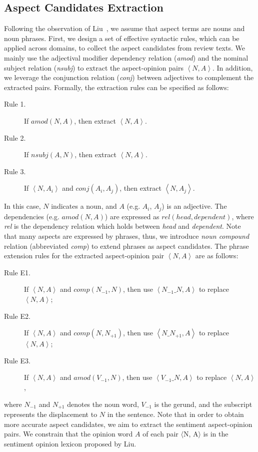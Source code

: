 \subsection{Aspect Candidates Extraction}
\label{sec:candidate}
Following the observation of Liu~\cite{hu2004mining,liu2015automated}, 
we assume that aspect terms are nouns and noun phrases.  
First, we design a set of effective syntactic rules, which can be applied across domains, to collect the aspect candidates from review texts.
We mainly use the adjectival modifier dependency relation (\emph{amod})
and the nominal subject relation (\emph{nsubj})
to extract the aspect-opinion pairs $\left\langle N, A \right\rangle$.
In addition, we leverage the conjunction relation (\emph{conj}) between 
adjectives to complement the extracted pairs. 
Formally, the extraction rules can be specified as follows:
\begin{description}
	\item [Rule 1.] If $amod(N, A)$, then extract $\left\langle N, A \right\rangle$.
	\item [Rule 2.]If $nsubj(A, N)$, then extract $\left\langle N, A \right\rangle$.
	\item [Rule 3.]If $\left\langle N, A_i \right\rangle$ and $conj(A_i, A_j)$, then extract $\left\langle N, A_j \right\rangle$.
\end{description}
In this case, $N$ indicates a noun, 
and $A$ (e.g. $A_i$, $A_j$) is an adjective. 
The dependencies (e.g. $amod(N, A)$) are expressed as $rel(head, dependent)$, where \textit{rel} is the dependency relation which holds
between \textit{head} and \textit{dependent}.
Note that many aspects are expressed by phrases,
thus, we introduce \emph{noun compound} relation 
(abbreviated \emph{comp}) to
extend phrases as aspect candidates.
The phrase extension rules for the extracted aspect-opinion pair $\left\langle N, A \right\rangle$ are as follows:
\begin{description}
	\item [Rule E1.] If $\left\langle N, A \right\rangle$ and $comp(N_{-1}, N)$, then use $\left\langle N_{-1}\_N, A \right\rangle$ to replace $\left\langle N, A \right\rangle$;
	\item [Rule E2.] If $\left\langle N, A \right\rangle$ and $comp(N, N_{+1})$, then use $\left\langle N\_N_{+1}, A \right\rangle$ to replace $\left\langle N, A \right\rangle$;
	\item [Rule E3.] If $\left\langle N, A \right\rangle$ and $amod(V_{-1}, N)$, then use $\left\langle V_{-1}\_N, A \right\rangle$ to replace $\left\langle N, A \right\rangle$,
\end{description}
where $N_{-1}$ and $N_{+1}$ denotes the noun word, $V_{-1}$ is the gerund, 
and the subscript represents the displacement to $N$ in the sentence.
Note that in order to obtain more accurate aspect candidates,
we aim to extract the sentiment aspect-opinion pairs. 
We constrain that the opinion word $A$ of each pair $\langle$N, A$\rangle$ is in the sentiment opinion lexicon proposed by Liu\cite{hu2004mining}.

